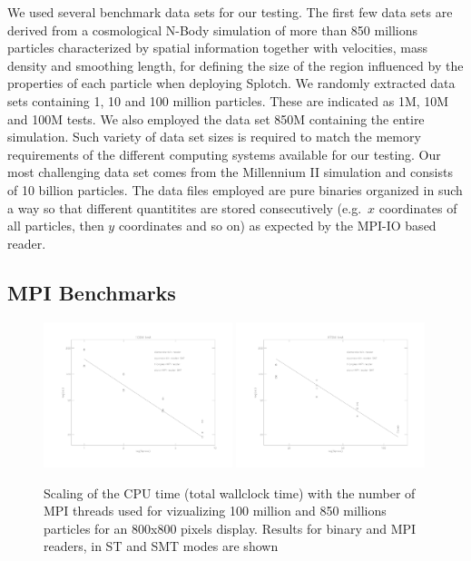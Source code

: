 \documentclass[1p,times]{elsarticle}
\begin{document}
We used several benchmark data sets for our testing. The first
few data sets are derived from a cosmological N-Body simulation of more than 850 millions
particles characterized by spatial information together with velocities, mass density 
and smoothing length, for defining the size of the region influenced by the properties 
of each particle when deploying Splotch. We randomly extracted data sets containing
1, 10 and 100 million particles. These are indicated as 1M, 
10M and 100M tests. We also employed the data set 850M containing the entire simulation.
Such variety of data set sizes is required to match the memory requirements of
the different computing systems available for our testing.  
Our most challenging data set comes from the Millennium II simulation \cite{2009MNRAS.398.1150B}
and consists of 10 billion particles. The data files employed are pure binaries organized in such a way so that different 
quantitites are stored consecutively (e.g.\ $x$ coordinates of all particles, then $y$ coordinates and so on) as expected by the MPI-IO based reader. 

\subsection{MPI Benchmarks}

\begin{figure}
\begin{center}
\includegraphics[width=0.49\textwidth]{bench100M_r.pdf}
\includegraphics[width=0.49\textwidth]{bench870M_r.pdf}
\end{center}
\caption{Scaling of the CPU time (total wallclock time) with the number of MPI threads 
used for vizualizing 100 million
and 850 millions particles for an 800x800 pixels display.
Results for binary and MPI readers, in ST and SMT modes are shown}\label{mpi100M}
\end{figure}
\end{document}
